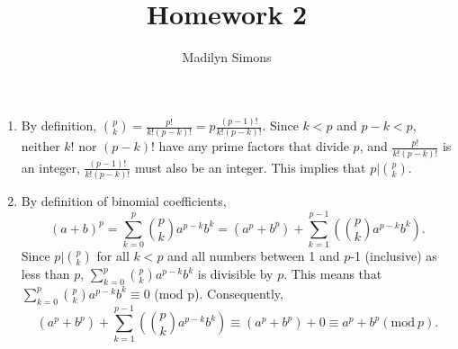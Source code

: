 \documentclass{article}
\title{Homework 2}
\author{Madilyn Simons}
\date{}
\begin{document}
\maketitle

\begin{enumerate}

\item By definition, $\binom{p}{k} = \frac{p!}{k!(p-k)!} = p\frac{(p-1)!}{k!(p-k)!}$.
Since $k < p$ and $p-k < p$, neither $k!$ nor $(p-k)!$ have any prime factors that divide $p$,
and $\frac{p!}{k!(p-k)!}$ is an integer, $\frac{(p-1)!}{k!(p-k)!}$ must also be an integer.
This implies that $p \vert \binom{p}{k}$.

\item By definition of binomial coefficients,
\[
(a+b)^p = \sum_{k=0}^{p} \binom{p}{k} a^{p-k}b^k = (a^p + b^p) +
\sum_{k=1}^{p-1} (\binom{p}{k} a^{p-k}b^k).
\]
Since $p \vert \binom{p}{k}$ for all $k < p$ and all numbers between 1 and $p$-1
(inclusive) as less than $p$, $\sum_{k=0}^{p} \binom{p}{k} a^{p-k}b^k$ is divisible
by $p$.  This means that $\sum_{k=0}^{p} \binom{p}{k} a^{p-k}b^k \equiv 0$ (mod p).
Consequently,
\[
(a^p + b^p) + \sum_{k=1}^{p-1} (\binom{p}{k} a^{p-k}b^k) \equiv (a^p + b^p) + 0
\equiv a^p + b ^p (\textrm{mod}\ p).
\]

\end{enumerate}
\end{document}
